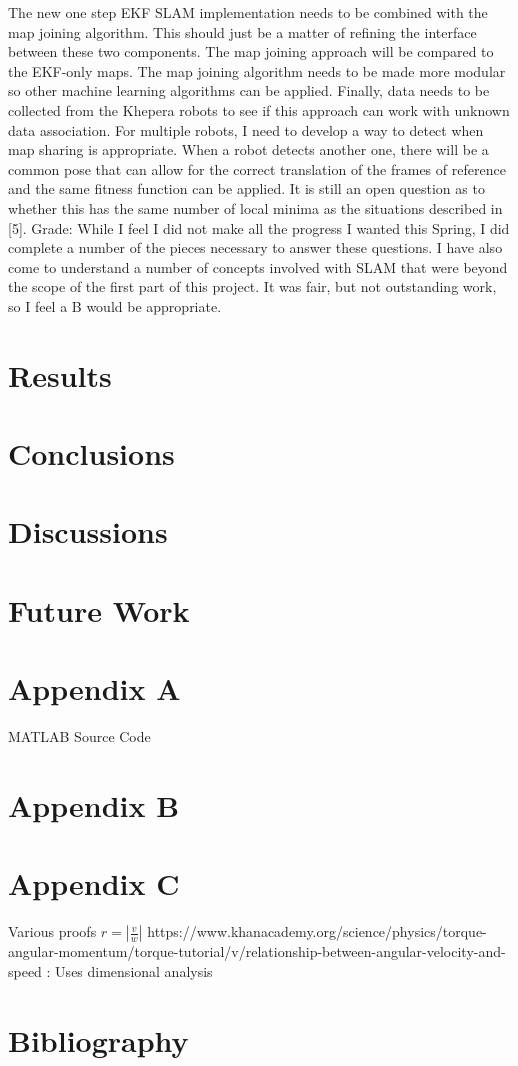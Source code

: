 \documentclass[12pt]{report}
\begin{document}
The new one step EKF SLAM implementation needs to be combined with the map joining algorithm.  This should just be a matter of refining the interface between these two components.  The map joining approach will be compared to the EKF-only maps.  The map joining algorithm needs to be made more modular so other machine learning algorithms can be applied.  Finally, data needs to be collected from the Khepera robots to see if this approach can work with unknown data association.  
For multiple robots, I need to develop a way to detect when map sharing is appropriate.  When a robot detects another one, there will be a common pose that can allow for the correct translation of the frames of reference and the same fitness function can be applied.  It is still an open question as to whether this has the same number of local minima as the situations described in [5].
Grade:
While I feel I did not make all the progress I wanted this Spring, I did complete a number of the pieces necessary to answer these questions.  I have also come to understand a number of concepts involved with SLAM that were beyond the scope of the first part of this project.  It was fair, but not outstanding work, so I feel a B would be appropriate.

\section{Results}

\section{Conclusions}

\section{Discussions}

\section{Future Work}

\section{Appendix A}
MATLAB Source Code

\section{Appendix B}

\section{Appendix C}
Various proofs
$r = |\frac{v}{w}|$ https://www.khanacademy.org/science/physics/torque-angular-momentum/torque-tutorial/v/relationship-between-angular-velocity-and-speed : Uses dimensional analysis

\section{Bibliography}

{}
\end{document}
